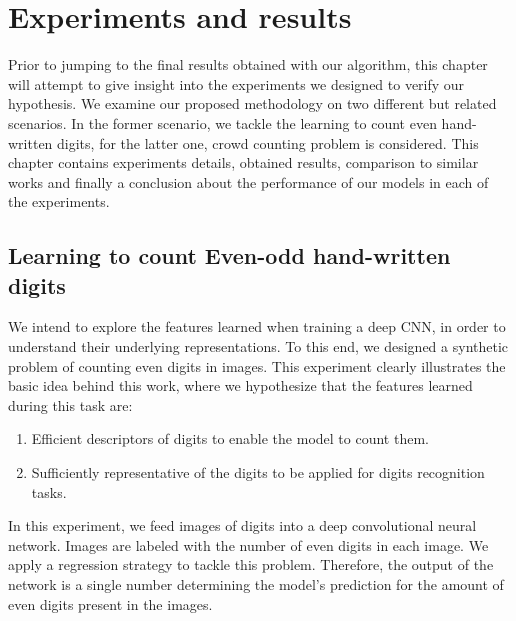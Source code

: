 \newpage
\chapter{Experiments and results}
\label{sec:experiments}

Prior to jumping to the final results obtained with our algorithm, this
chapter will attempt to give insight into the experiments we designed to verify our hypothesis. We examine our proposed methodology on two different but related scenarios. In the former scenario, we tackle the learning to count even hand-written digits, for the latter one, crowd counting problem is considered.   
This chapter contains experiments details, obtained results, comparison to similar works and finally a conclusion about the performance of our models in each of the experiments.

\section{Learning to count Even-odd hand-written digits}

We intend to explore the features learned when training a deep CNN, in order to understand their underlying representations. To this end, we designed a synthetic problem of counting even digits in images. This experiment clearly illustrates the basic idea behind this work, where we hypothesize that the features learned during this task are:
\begin{enumerate}
\item Efficient descriptors of digits to enable the model to count them.
\item Sufficiently representative of the digits to be applied for digits recognition tasks. 
\end{enumerate}

In this experiment, we feed images of digits into a deep convolutional neural network. Images are labeled with the number of even digits in each image. We apply a regression strategy to tackle this problem. Therefore, the output of the network is a single number determining the model's prediction for the amount of even digits present in the images. 
 

